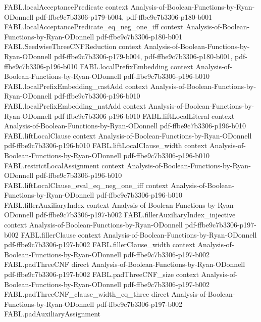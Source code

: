 \begin{theorem}
\proofstep
  {FABL.localAcceptancePredicate}
  {context}
  {Analysis-of-Boolean-Functions-by-Ryan-ODonnell}
  {pdf-ffbe9c7b3306-p179-b004,
    pdf-ffbe9c7b3306-p180-b001}
\proofstep
  {FABL.localAcceptancePredicate_eq_neg_one_iff}
  {context}
  {Analysis-of-Boolean-Functions-by-Ryan-ODonnell}
  {pdf-ffbe9c7b3306-p180-b001}
\proofstep
  {FABL.SeedwiseThreeCNFReduction}
  {context}
  {Analysis-of-Boolean-Functions-by-Ryan-ODonnell}
  {pdf-ffbe9c7b3306-p179-b004,
    pdf-ffbe9c7b3306-p180-b001,
    pdf-ffbe9c7b3306-p196-b010}
\proofstep
  {FABL.localPrefixEmbedding}
  {context}
  {Analysis-of-Boolean-Functions-by-Ryan-ODonnell}
  {pdf-ffbe9c7b3306-p196-b010}
\proofstep
  {FABL.localPrefixEmbedding_castAdd}
  {context}
  {Analysis-of-Boolean-Functions-by-Ryan-ODonnell}
  {pdf-ffbe9c7b3306-p196-b010}
\proofstep
  {FABL.localPrefixEmbedding_natAdd}
  {context}
  {Analysis-of-Boolean-Functions-by-Ryan-ODonnell}
  {pdf-ffbe9c7b3306-p196-b010}
\proofstep
  {FABL.liftLocalLiteral}
  {context}
  {Analysis-of-Boolean-Functions-by-Ryan-ODonnell}
  {pdf-ffbe9c7b3306-p196-b010}
\proofstep
  {FABL.liftLocalClause}
  {context}
  {Analysis-of-Boolean-Functions-by-Ryan-ODonnell}
  {pdf-ffbe9c7b3306-p196-b010}
\proofstep
  {FABL.liftLocalClause_width}
  {context}
  {Analysis-of-Boolean-Functions-by-Ryan-ODonnell}
  {pdf-ffbe9c7b3306-p196-b010}
\proofstep
  {FABL.restrictLocalAssignment}
  {context}
  {Analysis-of-Boolean-Functions-by-Ryan-ODonnell}
  {pdf-ffbe9c7b3306-p196-b010}
\proofstep
  {FABL.liftLocalClause_eval_eq_neg_one_iff}
  {context}
  {Analysis-of-Boolean-Functions-by-Ryan-ODonnell}
  {pdf-ffbe9c7b3306-p196-b010}
\proofstep
  {FABL.fillerAuxiliaryIndex}
  {context}
  {Analysis-of-Boolean-Functions-by-Ryan-ODonnell}
  {pdf-ffbe9c7b3306-p197-b002}
\proofstep
  {FABL.fillerAuxiliaryIndex_injective}
  {context}
  {Analysis-of-Boolean-Functions-by-Ryan-ODonnell}
  {pdf-ffbe9c7b3306-p197-b002}
\proofstep
  {FABL.fillerClause}
  {context}
  {Analysis-of-Boolean-Functions-by-Ryan-ODonnell}
  {pdf-ffbe9c7b3306-p197-b002}
\proofstep
  {FABL.fillerClause_width}
  {context}
  {Analysis-of-Boolean-Functions-by-Ryan-ODonnell}
  {pdf-ffbe9c7b3306-p197-b002}
\proofstep
  {FABL.padThreeCNF}
  {direct}
  {Analysis-of-Boolean-Functions-by-Ryan-ODonnell}
  {pdf-ffbe9c7b3306-p197-b002}
\proofstep
  {FABL.padThreeCNF_size}
  {context}
  {Analysis-of-Boolean-Functions-by-Ryan-ODonnell}
  {pdf-ffbe9c7b3306-p197-b002}
\proofstep
  {FABL.padThreeCNF_clause_width_eq_three}
  {direct}
  {Analysis-of-Boolean-Functions-by-Ryan-ODonnell}
  {pdf-ffbe9c7b3306-p197-b002}
\proofstep
  {FABL.padAuxiliaryAssignment}

\end{theorem}
